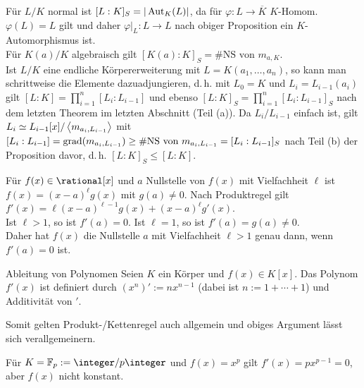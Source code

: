 \begin{Bem}
    Für $L/K$ normal ist $[L:K]_S = |\operatorname{Aut}_K(L)|$,
    da für $\varphi\colon L \rightarrow \overline{K}$ $K$-Homom.
    $\varphi(L) = L$ gilt und daher
    $\varphi|_L\colon L \rightarrow L$ nach obiger Proposition
    ein $K$-Automorphismus ist.\\
    Für $K(a)/K$ algebraisch gilt $[K(a) : K]_S = \#\text{NS von } m_{a,K}$.\\
    Ist $L/K$ eine endliche Körpererweiterung mit $L = K(a_1, \dotsc, a_n)$,
    so kann man schrittweise die Elemente dazuadjungieren, d.\,h.
    mit $L_0 = K$ und $L_i = L_{i-1}(a_i)$ gilt
    $[L:K] = \prod_{i=1}^n [L_i : L_{i-1}]$ und ebenso
    $[L:K]_S = \prod_{i=1}^n [L_i : L_{i-1}]_S$ nach dem letzten Theorem
    im letzten Abschnitt (Teil (a)).
    Da $L_i / L_{i-1}$ einfach ist, gilt
    $L_i \simeq L_{i-1}[x]/\left\langle m_{a_i,L_{i-1}}\right\rangle$ mit
    $[L_i : L_{i-1}] = \operatorname{grad}(m_{a_i,L_{i-1}}) \ge
    \# \text{NS von } m_{a_i,L_{i-1}} = [L_i : L_{i-1}]_S$ nach Teil (b)
    der Proposition davor, d.\,h.
    $[L:K]_S \le [L:K]$.
\end{Bem}

\linie

\begin{Bsp}
    Für $f(x) \in \rational[x]$ und $a$ Nullstelle von $f(x)$ mit Vielfachheit
    $\ell$ ist $f(x) = (x - a)^\ell g(x)$ mit $g(a) \not= 0$.
    Nach Produktregel gilt $f'(x) = \ell (x - a)^{\ell-1} g(x) +
    (x - a)^\ell g'(x)$.\\
    Ist $\ell > 1$, so ist $f'(a) = 0$.
    Ist $\ell = 1$, so ist $f'(a) = g(a) \not= 0$.\\
    Daher hat $f(x)$ die Nullstelle $a$ mit Vielfachheit $\ell > 1$ genau dann,
    wenn $f'(a) = 0$ ist.
\end{Bsp}

\begin{Def}{Ableitung von Polynomen}
    Seien $K$ ein Körper und $f(x) \in K[x]$.
    Das Polynom $f'(x)$ ist definiert durch $(x^n)' := n x^{n-1}$
    (dabei ist $n := 1 + \dotsb + 1$) und Additivität von $'$.
\end{Def}

\begin{Bem}
    Somit gelten Produkt-/Kettenregel auch allgemein und obiges
    Argument lässt sich verallgemeinern.
\end{Bem}

\begin{Bsp}
    Für $K = \F_p := \integer/p\integer$ und $f(x) = x^p$ gilt
    $f'(x) = p x^{p-1} = 0$,
    aber $f(x)$ nicht konstant.
\end{Bsp}

